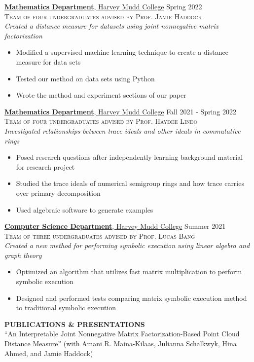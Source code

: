 \documentclass[11pt]{article}
\newcommand{\hdr}[1]{\textcolor{blue(ryb)}{\textbf{#1}}}
\newcommand{\role}[3]{\underline{\textbf{#1}, {#2}} \hfill #3}
\begin{document}
\smallskip
\role{Mathematics Department}{Harvey Mudd College}{Spring 2022}\\
\textsc{Team of four undergraduates advised by Prof. Jamie Haddock}\\
\textit{Created a distance measure for datasets  using joint nonnegative matrix factorization}
\begin{itemize}
\item Modified a supervised machine learning technique to create a distance measure for data sets
\item Tested our method on data sets using Python
\item Wrote the method and experiment sections of our paper
\end{itemize}
\smallskip
\role{Mathematics Department}{Harvey Mudd College}{Fall 2021 - Spring 2022}\\
\textsc{Team of four undergraduates advised by Prof. Haydee Lindo}\\
\textit{Investigated relationships between trace ideals and other ideals in commutative rings}
\begin{itemize}
  \item Posed research questions after independently learning background material for research project
  \item Studied the trace ideals of numerical semigroup rings and how trace carries over primary decomposition
  \item Used algebraic software to generate examples
\end{itemize}
\smallskip
\role{Computer Science Department}{Harvey Mudd College}{Summer 2021}\\
\textsc{Team of three undergraduates advised by Prof. Lucas Bang}\\
\textit{Created a new method for performing symbolic execution using linear algebra and graph theory}\\
\begin{itemize}
\item Optimized an algorithm that utilizes fast matrix multiplication to perform symbolic execution\\
\item Designed and performed tests comparing matrix symbolic execution method to traditional symbolic execution
\end{itemize}
\newpage
\hdr{PUBLICATIONS \& PRESENTATIONS}\\
``An Interpretable Joint Nonnegative Matrix Factorization-Based Point Cloud Distance Measure'' (with Amani R. Maina-Kilaas, Julianna Schalkwyk, Hina Ahmed, and Jamie Haddock)
\end{document}
